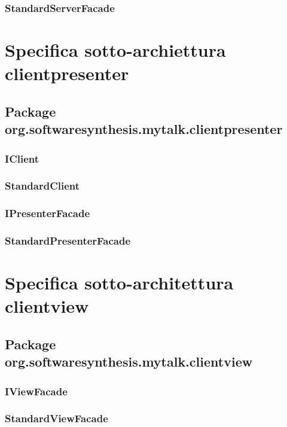 \subsubsection{StandardServerFacade}

\clearpage

\section{Specifica sotto-archiettura clientpresenter}

\subsection{Package org.softwaresynthesis.mytalk.clientpresenter}

\subsubsection{IClient}

\subsubsection{StandardClient}

\subsubsection{IPresenterFacade}

\subsubsection{StandardPresenterFacade}

\clearpage

\section{Specifica sotto-architettura clientview}

\subsection{Package org.softwaresynthesis.mytalk.clientview}

\subsubsection{IViewFacade}

\subsubsection{StandardViewFacade}

